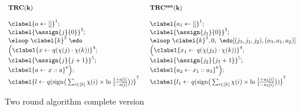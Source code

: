 \begin{figure}
\[
{
\begin{array}{l}
\bf{TRC}(k) \\
    \\
   \clabel{ a \leftarrow []}^{1} ; \\
    \clabel{\assign{j}{0} }^{2} ; \\
    \eloop ~ \clabel{k}^{3} ~ \edo ~ \\
    \Big(
     \clabel{x \leftarrow q(\chi(j)\cdot \chi(k)) }^{4}  ; \\
     \clabel{\assign{j}{j+1}}^{5} ;\\
    \clabel{a \leftarrow x :: a}^{6}       \Big);\\
    \clabel{l \leftarrow q(\mathrm{sign}\big (\sum_{i\in [k]} \chi(i)\times\ln\frac{1+a[i]}{1-a[i]} \big ))}^{7}\\
\end{array} ~~
{
\begin{array}{l}
\bf{TRC^{ssa}}(k) \\
    \\
    \clabel{a_1 \leftarrow []}^{1} ; \\
    \clabel{\assign{j_1}{0} }^{2} ; \\
    \eloop ~ \clabel{k}^{3}, 0, ~ \edo [(j_3, j_1,j_2),(a_3, a_1,a_2)]~ \\
    \Big(
    \clabel{ x_1 \leftarrow q(\chi(j_3)\cdot \chi(k))}^{4}  ; \\
    \clabel{ \assign{j_2}{j_3+1} }^{5} ;\\
    \clabel{a_2 \leftarrow x_1 :: a_3}^{6}       \Big);\\
    \clabel{l_1 \leftarrow q(\mathrm{sign}\big (\sum_{i\in [k]} \chi(i)\times\ln\frac{1+a_3[i]}{1-a_3[i]} \big ))}^{7}\\
\end{array}
}
}
\]  
    \caption{Two round algorithm complete version}
    \label{fig:tworound_complete}
\end{figure}

